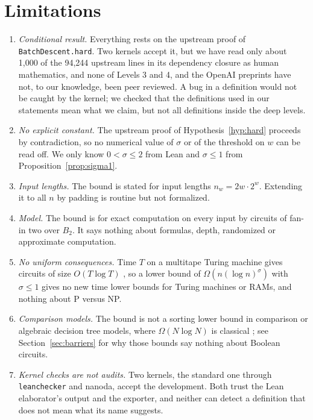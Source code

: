 \documentclass[11pt]{amsart}
\theoremstyle{definition}
\theoremstyle{remark}
\newcommand{\lean}[1]{\texttt{#1}}
\begin{document}
\section{Limitations}\label{sec:limits}
\begin{enumerate}
\item \emph{Conditional result.} Everything rests on the upstream proof of \lean{BatchDescent.hard}. Two kernels accept it, but we have read only about 1,000 of the 94,244 upstream lines in its dependency closure as human mathematics, and none of Levels 3 and 4, and the OpenAI preprints have not, to our knowledge, been peer reviewed. A bug in a definition would not be caught by the kernel; we checked that the definitions used in our statements mean what we claim, but not all definitions inside the deep levels.
\item \emph{No explicit constant.} The upstream proof of Hypothesis~\ref{hyp:hard} proceeds by contradiction, so no numerical value of $\sigma$ or of the threshold on $w$ can be read off. We only know $0<\sigma\le 2$ from Lean and $\sigma\le 1$ from Proposition~\ref{prop:sigma1}.
\item \emph{Input lengths.} The bound is stated for input lengths $n_w=2w\cdot 2^w$. Extending it to all $n$ by padding is routine but not formalized.
\item \emph{Model.} The bound is for exact computation on every input by circuits of fan-in two over $B_2$. It says nothing about formulas, depth, randomized or approximate computation.
\item \emph{No uniform consequences.} Time $T$ on a multitape Turing machine gives circuits of size $O(T\log T)$ \cite{PF79}, so a lower bound of $\Omega(n(\log n)^{\sigma})$ with $\sigma\le 1$ gives no new time lower bounds for Turing machines or RAMs, and nothing about P versus NP.
\item \emph{Comparison models.} The bound is not a sorting lower bound in comparison or algebraic decision tree models, where $\Omega(N\log N)$ is classical \cite{BenOr83}; see Section~\ref{sec:barriers} for why those bounds say nothing about Boolean circuits.
\item \emph{Kernel checks are not audits.} Two kernels, the standard one through \lean{leanchecker} and nanoda, accept the development. Both trust the Lean elaborator's output and the exporter, and neither can detect a definition that does not mean what its name suggests.
\end{enumerate}
\end{document}
